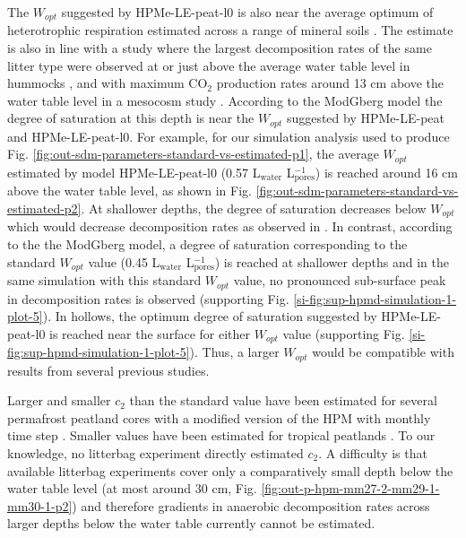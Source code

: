 \documentclass[esd, manuscript]{copernicus}
\begin{document}
The \(W_{opt}\) suggested by HPMe-LE-peat-l0 is also near the average optimum of heterotrophic respiration estimated across a range of mineral soils \citep{Moyano.2013}. The estimate is also in line with a study where the largest decomposition rates of the same litter type were observed at or just above the average water table level in hummocks \citep{Belyea.1996}, and with maximum CO\(_2\) production rates around 13 cm above the water table level in a mesocosm study \citep{Blodau.2004}. According to the ModGberg model the degree of saturation at this depth is near the \(W_{opt}\) suggested by HPMe-LE-peat and HPMe-LE-peat-l0. For example, for our simulation analysis used to produce Fig. \ref{fig:out-sdm-parameters-standard-vs-estimated-p1}, the average \(W_{opt}\) estimated by model HPMe-LE-peat-l0 (0.57 L\(_\text{water}\) L\(_\text{pores}^{-1}\)) is reached around 16 cm above the water table level, as shown in Fig. \ref{fig:out-sdm-parameters-standard-vs-estimated-p2}. At shallower depths, the degree of saturation decreases below \(W_{opt}\) which would decrease decomposition rates as observed in \citet{Belyea.1996}. In contrast, according to the the ModGberg model, a degree of saturation corresponding to the standard \(W_{opt}\) value (0.45 L\(_\text{water}\) L\(_\text{pores}^{-1}\)) is reached at shallower depths and in the same simulation with this standard \(W_{opt}\) value, no pronounced sub-surface peak in decomposition rates is observed (supporting Fig. \ref{si-fig:sup-hpmd-simulation-1-plot-5}). In hollows, the optimum degree of saturation suggested by HPMe-LE-peat-l0 is reached near the surface for either \(W_{opt}\) value (supporting Fig. \ref{si-fig:sup-hpmd-simulation-1-plot-5}). Thus, a larger \(W_{opt}\) would be compatible with results from several previous studies.

Larger and smaller \(c_2\) than the standard value have been estimated for several permafrost peatland cores with a modified version of the HPM with monthly time step \citep{Treat.2021, Treat.2022}. Smaller values have been estimated for tropical peatlands \citep{Kurnianto.2015}. To our knowledge, no litterbag experiment directly estimated \(c_2\). A difficulty is that available litterbag experiments cover only a comparatively small depth below the water table level (at most around 30 cm, Fig. \ref{fig:out-p-hpm-mm27-2-mm29-1-mm30-1-p2}) and therefore gradients in anaerobic decomposition rates across larger depths below the water table currently cannot be estimated.
\end{document}

